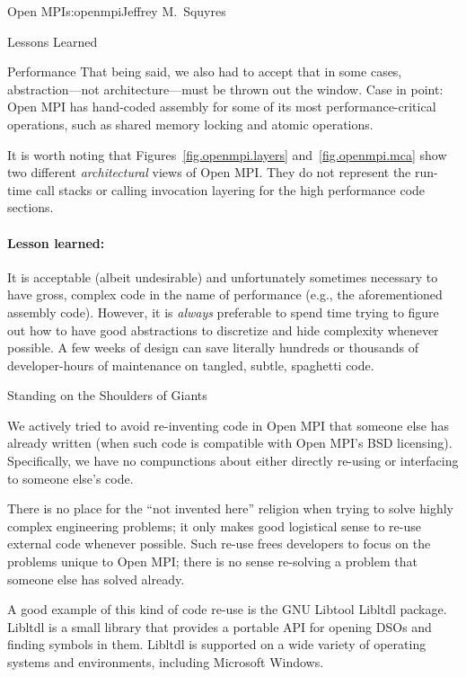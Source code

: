 \begin{aosachapter}{Open MPI}{s:openmpi}{Jeffrey M.\ Squyres}
\begin{aosasect1}{Lessons Learned}
\begin{aosasect2}{Performance}
That being said, we also had to accept that in some cases, abstraction---not 
architecture---must be thrown out the window.  Case in point:
Open MPI has hand-coded assembly for some of its most
performance-critical operations, such as shared memory locking and
atomic operations.

It is worth noting that Figures~\ref{fig.openmpi.layers}
and~\ref{fig.openmpi.mca} show two different \emph{architectural} views
of Open MPI.
%
They do not represent the run-time call stacks or calling invocation
layering for the high performance code sections.


\paragraph{Lesson learned:} 

It is acceptable (albeit undesirable) and unfortunately sometimes
necessary to have gross, complex code in the name of performance
(e.g., the aforementioned assembly code).
%
However, it is \emph{always} preferable to spend time trying to figure
out how to have good abstractions to discretize and hide complexity
whenever possible.  A few weeks of design can save literally hundreds
or thousands of developer-hours of maintenance on tangled, subtle, spaghetti
code.

\end{aosasect2}


\begin{aosasect2}{Standing on the Shoulders of Giants}

We actively tried to avoid re-inventing code in Open MPI that someone
else has already written (when such code is compatible with Open
MPI's BSD licensing).
%
Specifically, we have no compunctions about either directly re-using
or interfacing to someone else's code.

There is no place for the ``not invented here'' religion when trying
to solve highly complex engineering problems; it only makes good
logistical sense to re-use external code whenever possible.
%
Such re-use frees developers to focus on the problems unique to Open
MPI; there is no sense re-solving a problem that someone else has
solved already.

A good example of this kind of code re-use is the GNU Libtool Libltdl
package.  Libltdl is a small library that provides a portable API for
opening DSOs and finding symbols in them.  Libltdl is supported on a
wide variety of operating systems and environments, including
Microsoft Windows.


\end{aosasect2}
\end{aosasect1}
\end{aosachapter}
